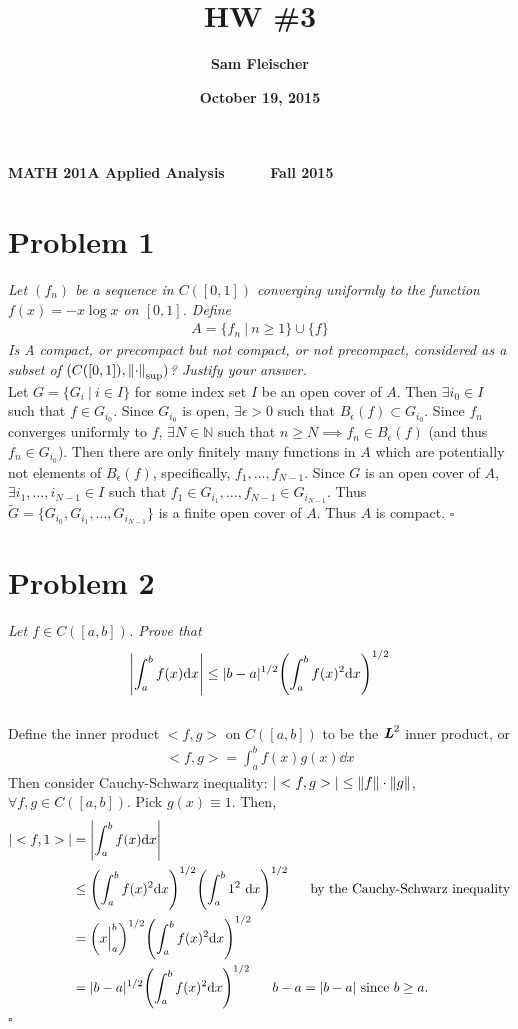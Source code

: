\documentclass[12pt]{article}
\title{\bf HW \#3}
\author{\bf Sam Fleischer}
\date{\bf October 19, 2015}
\begin{document}
{\bf MATH 201A \hfill Applied Analysis \ \ \ \ \ \hfill Fall 2015} 

{\let\newpage\relax\maketitle}

\section*{Problem 1}
\emph{Let $(f_n)$ be a sequence in $C([0,1])$ converging uniformly to the function $f(x) = -x\log x$ on $[0,1]$.  Define}
\begin{align*}
	A = \{f_n\ |\ n \geq 1\}\cup\{f\}
\end{align*}
\emph{Is A compact, or precompact but not compact, or not precompact, considered as a subset of $(C([0,1]), \norm{\cdot}_{\text{sup}})$?  Justify your answer.} \\

Let $G = \{G_i\ |\ i\in I\}$ for some index set $I$ be an open cover of $A$.  Then $\exists i_0 \in I$ such that $f \in G_{i_0}$.  Since $G_{i_0}$ is open, $\exists \epsilon > 0$ such that $B_\epsilon(f) \subset G_{i_0}$.  Since $f_n$ converges uniformly to $f$, $\exists N\in\mathbb{N}$ such that $n \geq N \implies f_n\in B_\epsilon(f)$ (and thus $f_n \in G_{i_0}$).  Then there are only finitely many functions in $A$ which are potentially not elements of $B_\epsilon(f)$, specifically, $f_1,\dots, f_{N-1}$.  Since $G$ is an open cover of $A$, $\exists i_{1}, \dots, i_{N-1} \in I$ such that $f_1 \in G_{i_1}, \dots, f_{N-1} \in G_{i_{N-1}}$.  Thus $\widetilde{G} = \{G_{i_0}, G_{i_1}, \dots, G_{i_{N-1}}\}$ is a finite open cover of $A$.  Thus $A$ is compact. \hfill $\square$

\section*{Problem 2}
\emph{Let $f \in C([a,b])$.  Prove that}
\begin{equation*}
	\left|\int_a^b f(x) \dd x\right| \leq |b - a|^{1/2}\qty(\int_a^b f(x)^2 \dd x)^{1/2}
\end{equation*} \\

Define the inner product $<f,g>$ on $C([a,b])$ to be the $\textbf{\emph{L}}^2$ inner product, or
\begin{align*}
	<f,g> = \int_a^b f(x) g(x) \dd x
\end{align*}
Then consider Cauchy-Schwarz inequality: $|<f,g>| \leq \norm{f}\cdot\norm{g}$, $\forall f, g \in C([a,b])$.  Pick $g(x) \equiv 1$.  Then,
\begin{align*}
	|<f,1>| &= \left|\int_a^b f(x) \dd x\right|\\
	&\leq \qty(\int_a^b f(x)^2\dd x)^{1/2}\qty(\int_a^b 1^2\ \dd x)^{1/2}\ \ \ \ \ \text{by the Cauchy-Schwarz inequality} \\
	&= \qty(x\Big|_a^b)^{1/2} \qty(\int_a^b f(x)^2\dd x)^{1/2}\\
	&= |b - a|^{1/2}\qty(\int_a^b f(x)^2\dd x)^{1/2}\ \ \ \ \ \text{$b - a = |b - a|$ since $b \geq a$.}
\end{align*}\hfill $\square$
\end{document}
